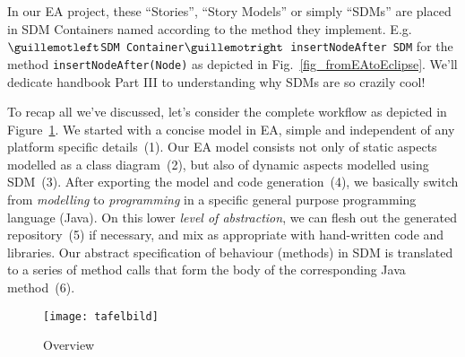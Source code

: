 In our EA project, these ``Stories'', ``Story Models'' or simply ``SDMs'' are  placed in SDM Containers named according to the method they implement.  
E.g.  \texttt{$\guillemotleft$SDM Container$\guillemotright$ insertNodeAfter SDM} for the method  \texttt{insertNodeAfter(Node)} as depicted in
Fig.~\ref{fig_fromEAtoEclipse}.  
We'll dedicate handbook Part III to understanding why SDMs are so  {\huge crazily} cool!
 
To recap all we've discussed, let's consider the complete workflow as depicted in Figure~\ref{fig_Overview}. 
We started with a concise model in EA, simple and independent of any platform specific details~(1).  
Our EA model consists not only of static aspects modelled as a class diagram~(2), but also of dynamic
aspects modelled using SDM~(3).  After exporting the model and code generation~(4), we basically switch from \emph{modelling} to \emph{programming} in a specific general purpose programming language (Java).  
On this lower \emph{level of abstraction}, we can flesh out the generated repository~(5) if necessary, and mix as appropriate with hand-written code and libraries.  Our abstract specification of behaviour (methods) in SDM is translated to a series of method calls that form the body of the corresponding Java method~(6).


\vspace{1.5cm}

\begin{figure}[htbp]
	\centering
  \texttt{[image: tafelbild]}
	\caption{Overview}
	\label{fig_Overview}
\end{figure}

\newpage